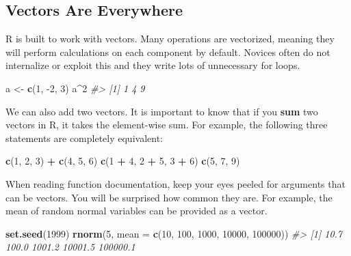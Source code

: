 \documentclass[
]{book}
\newenvironment{Shaded}{\begin{snugshade}}{\end{snugshade}}
\newcommand{\CommentTok}[1]{\textcolor[rgb]{0.56,0.35,0.01}{\textit{#1}}}
\newcommand{\DataTypeTok}[1]{\textcolor[rgb]{0.13,0.29,0.53}{#1}}
\newcommand{\DecValTok}[1]{\textcolor[rgb]{0.00,0.00,0.81}{#1}}
\newcommand{\KeywordTok}[1]{\textcolor[rgb]{0.13,0.29,0.53}{\textbf{#1}}}
\newcommand{\NormalTok}[1]{#1}
\newcommand{\OperatorTok}[1]{\textcolor[rgb]{0.81,0.36,0.00}{\textbf{#1}}}
\newcommand{\StringTok}[1]{\textcolor[rgb]{0.31,0.60,0.02}{#1}}
\begin{document}
\hypertarget{vectors-are-everywhere}{%
\subsection{Vectors Are Everywhere}\label{vectors-are-everywhere}}

R is built to work with vectors. Many operations are vectorized, meaning they will perform calculations on each component by default. Novices often do not internalize or exploit this and they write lots of unnecessary for loops.

\begin{Shaded}
\begin{Highlighting}[]
\NormalTok{a <-}\StringTok{ }\KeywordTok{c}\NormalTok{(}\DecValTok{1}\NormalTok{, }\DecValTok{-2}\NormalTok{, }\DecValTok{3}\NormalTok{)}
\NormalTok{a}\OperatorTok{^}\DecValTok{2}
\CommentTok{#> [1] 1 4 9}
\end{Highlighting}
\end{Shaded}

We can also add two vectors. It is important to know that if you \textbf{sum} two vectors in R, it takes the element-wise sum. For example, the following three statements are completely equivalent:

\begin{Shaded}
\begin{Highlighting}[]
\KeywordTok{c}\NormalTok{(}\DecValTok{1}\NormalTok{, }\DecValTok{2}\NormalTok{, }\DecValTok{3}\NormalTok{) }\OperatorTok{+}\StringTok{ }\KeywordTok{c}\NormalTok{(}\DecValTok{4}\NormalTok{, }\DecValTok{5}\NormalTok{, }\DecValTok{6}\NormalTok{)}
\KeywordTok{c}\NormalTok{(}\DecValTok{1} \OperatorTok{+}\StringTok{ }\DecValTok{4}\NormalTok{, }\DecValTok{2} \OperatorTok{+}\StringTok{ }\DecValTok{5}\NormalTok{, }\DecValTok{3} \OperatorTok{+}\StringTok{ }\DecValTok{6}\NormalTok{)}
\KeywordTok{c}\NormalTok{(}\DecValTok{5}\NormalTok{, }\DecValTok{7}\NormalTok{, }\DecValTok{9}\NormalTok{)}
\end{Highlighting}
\end{Shaded}

When reading function documentation, keep your eyes peeled for arguments that can be vectors. You will be surprised how common they are. For example, the mean of random normal variables can be provided as a vector.

\begin{Shaded}
\begin{Highlighting}[]
\KeywordTok{set.seed}\NormalTok{(}\DecValTok{1999}\NormalTok{)}
\KeywordTok{rnorm}\NormalTok{(}\DecValTok{5}\NormalTok{, }\DataTypeTok{mean =} \KeywordTok{c}\NormalTok{(}\DecValTok{10}\NormalTok{, }\DecValTok{100}\NormalTok{, }\DecValTok{1000}\NormalTok{, }\DecValTok{10000}\NormalTok{, }\DecValTok{100000}\NormalTok{))}
\CommentTok{#> [1]     10.7    100.0   1001.2  10001.5 100000.1}
\end{Highlighting}
\end{Shaded}
\end{document}
